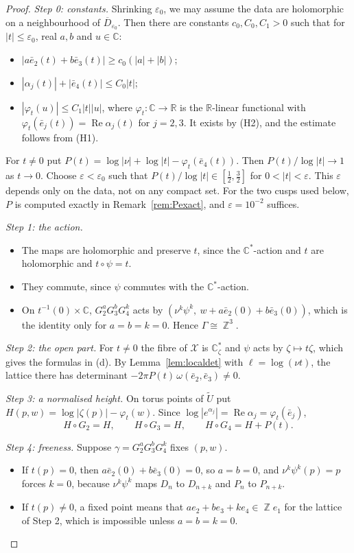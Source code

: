 \documentclass{article}
\DeclareMathOperator{\Z}{\mathbb{Z}}
\theoremstyle{definition}
\theoremstyle{plain}
\newcommand{\R}{\mathbb{R}}
\newcommand{\C}{\mathbb{C}}
\newcommand{\cX}{\mathcal{X}}
\newcommand{\eb}{\bar e}
\newcommand{\Ut}{\widetilde{U}}
\DeclareMathOperator{\Rea}{Re}
\begin{document}
\begin{proof}
\emph{Step 0: constants.} Shrinking $\varepsilon_0$, we may assume the data are holomorphic
on a neighbourhood of $\overline D_{\varepsilon_0}$. Then there are constants
$c_0,C_0,C_1>0$ such that for $|t|\le\varepsilon_0$, real $a,b$ and $u\in\C$:
\begin{itemize}
\item $|a\eb_2(t)+b\eb_3(t)|\ge c_0(|a|+|b|)$;
\item $|\alpha_j(t)|+|\eb_4(t)|\le C_0|t|$;
\item $|\varphi_t(u)|\le C_1|t||u|$, where $\varphi_t\colon\C\to\R$ is the $\R$-linear
  functional with $\varphi_t(\eb_j(t))=\Rea\alpha_j(t)$ for $j=2,3$. It exists by (H2),
  and the estimate follows from (H1).
\end{itemize}
For $t\neq0$ put $P(t)=\log|\nu|+\log|t|-\varphi_t(\eb_4(t))$. Then $P(t)/\log|t|\to1$ as
$t\to0$. Choose $\varepsilon<\varepsilon_0$
such that $P(t)/\log|t|\in[\tfrac12,\tfrac32]$ for $0<|t|<\varepsilon$. This $\varepsilon$
depends only on the data, not on any compact set. For the two cusps used below, $P$ is
computed exactly in Remark~\ref{rem:Pexact}, and $\varepsilon=10^{-2}$ suffices.

\emph{Step 1: the action.}
\begin{itemize}
\item The maps are holomorphic and preserve $t$, since the $\C^*$-action and $t$ are
  holomorphic and $t\circ\psi=t$.
\item They commute, since $\psi$ commutes with the $\C^*$-action.
\item On $t^{-1}(0)\times\C$, $G_2^aG_3^bG_4^k$ acts by
  $(\nu^k\psi^k,\ w+a\eb_2(0)+b\eb_3(0))$, which is the identity only for $a=b=k=0$.
  Hence $\Gamma\cong\Z^3$.
\end{itemize}

\emph{Step 2: the open part.} For $t\ne0$ the fibre of $\cX$ is $\C^*_\zeta$ and $\psi$
acts by $\zeta\mapsto t\zeta$, which gives the formulas in (d). By
Lemma~\ref{lem:localdet} with $\ell=\log(\nu t)$, the lattice there has determinant
$-2\pi P(t)\,\omega(\eb_2,\eb_3)\neq0$.

\emph{Step 3: a normalised height.} On torus points of $\Ut$ put
$H(p,w)=\log|\zeta(p)|-\varphi_t(w)$. Since $\log|e^{\alpha_j}|=\Rea\alpha_j=\varphi_t(\eb_j)$,
\[
H\circ G_2=H,\qquad H\circ G_3=H,\qquad H\circ G_4=H+P(t).
\]

\emph{Step 4: freeness.} Suppose $\gamma=G_2^aG_3^bG_4^k$ fixes $(p,w)$.
\begin{itemize}
\item If $t(p)=0$, then $a\eb_2(0)+b\eb_3(0)=0$, so $a=b=0$, and $\nu^k\psi^k(p)=p$
  forces $k=0$, because $\nu^k\psi^k$ maps $D_n$ to $D_{n+k}$ and $P_n$ to $P_{n+k}$.
\item If $t(p)\ne0$, a fixed point means that $ae_2+be_3+ke_4\in\Z e_1$ for the
  lattice of Step 2, which is impossible unless $a=b=k=0$.
\end{itemize}


\end{proof}
\end{document}

